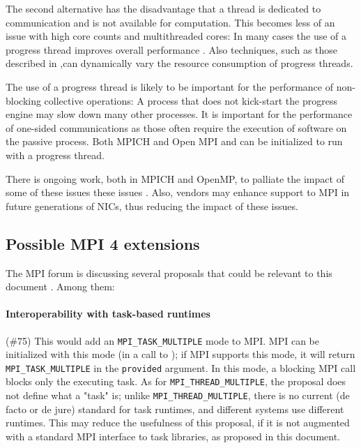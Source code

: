 \begin{enumerate}
			The second alternative has the disadvantage that a thread is 
			dedicated to communication and is not available for computation. 
			This becomes less of an issue with high core counts and 
			multithreaded cores: In many cases the use of a progress thread 
			improves overall performance \cite{vaidyanathan2015improving}. Also 
			techniques, such as 
			those described in 
			\cite{hoefler2008message,denis2014pioman},can dynamically vary the 
			resource 
			consumption of progress threads.
			
			The use of a progress thread is likely to be important for the 
			performance of non-blocking collective operations: A process that 
			does not kick-start the progress engine may slow down many other 
			processes. It is important for the performance of one-sided 
			communications as those often require the execution of software on 
			the passive process. Both MPICH and Open MPI and  can be 
			initialized to run with a progress thread.
		\end{enumerate}
	

There is ongoing work, both in MPICH and OpenMP, to palliate the impact of some 
of these issues
these issues \cite{balaji2008toward,mpicon2,mpi-thread,dang2017advanced}. Also, 
vendors may enhance support to 
MPI in 
future 
generations of NICs, thus reducing the impact of these issues. 
		
	\subsection{Possible MPI 4 extensions}
	The MPI forum is discussing several proposals that could be relevant to 
	this document \cite{MPI4}. Among them:
	
	\paragraph{Interoperability with task-based runtimes} (\#75) This would add 
	an \texttt{MPI\_TASK\_MULTIPLE} mode to MPI. MPI can be initialized with 
	this mode (in a call to ); if MPI supports this 
	mode, it will return \texttt{MPI\_TASK\_MULTIPLE} in the \texttt{provided} 
	argument. In this mode, a blocking MPI 
	call blocks only the executing task. As for 
	\texttt{MPI\_THREAD\_MULTIPLE}, the proposal does not define what a "task" 
	is; unlike  \texttt{MPI\_THREAD\_MULTIPLE}, there is no current (de facto 
	or de jure) standard for task runtimes, and different systems use different 
	runtimes. This may reduce the usefulness of this proposal, if it is not 
	augmented with a standard MPI interface to task libraries, as proposed in 
	this document.
	
